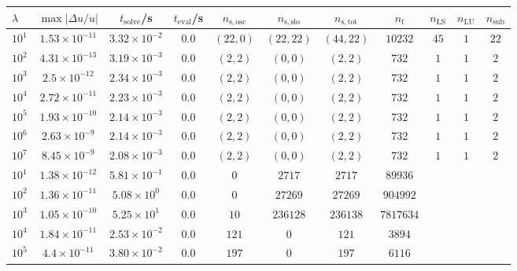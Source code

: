 \begin{tabular}{l c c c c c c c c c c}
\hline \hline 
$\lambda$  &  $\max|\Delta u/u|$  &  $t_{\mathrm{solve}}$/\si{\s}  &
$t_{\mathrm{eval}}$/\si{\s}  &  $n_{\mathrm{s,osc}}$  &  $n_{\mathrm{s,slo}}$
&  $n_{\mathrm{s,tot}}$  &  $n_{\mathrm{f}}$  &  $n_{\mathrm{LS}}$  &
$n_{\mathrm{LU}}$  &  $n_{\mathrm{sub}}$ \\ \hline
$10^1$  &  $1.53 \times 10^{-11}$  &  $3.32\times 10^{-2}$  &  $0.0$  &  $(22, 0)$  &  $(22, 22)$  &  $(44, 22)$  &  $10232$  &  $45$  &  $1$  &  $22$\\ 
$10^2$  &  $4.31 \times 10^{-13}$  &  $3.19\times 10^{-3}$  &  $0.0$  &  $(2, 2)$  &  $(0, 0)$  &  $(2, 2)$  &  $732$  &  $1$  &  $1$  &  $2$\\ 
$10^3$  &  $2.5 \times 10^{-12}$  &  $2.34\times 10^{-3}$  &  $0.0$  &  $(2, 2)$  &  $(0, 0)$  &  $(2, 2)$  &  $732$  &  $1$  &  $1$  &  $2$\\ 
$10^4$  &  $2.72 \times 10^{-11}$  &  $2.23\times 10^{-3}$  &  $0.0$  &  $(2, 2)$  &  $(0, 0)$  &  $(2, 2)$  &  $732$  &  $1$  &  $1$  &  $2$\\ 
$10^5$  &  $1.93 \times 10^{-10}$  &  $2.14\times 10^{-3}$  &  $0.0$  &  $(2, 2)$  &  $(0, 0)$  &  $(2, 2)$  &  $732$  &  $1$  &  $1$  &  $2$\\ 
$10^6$  &  $2.63 \times 10^{-9}$  &  $2.14\times 10^{-3}$   &  $0.0$  &  $(2, 2)$  &  $(0, 0)$  &  $(2, 2)$  &  $732$  &  $1$  &  $1$  &  $2$\\ 
$10^7$  &  $8.45 \times 10^{-9}$  &  $2.08\times 10^{-3}$  &  $0.0$  &  $(2, 2)$  &  $(0, 0)$  &  $(2, 2)$  &  $732$  &  $1$  &  $1$  &  $2$\\ 
\hline \hline
$10^1$  &  $1.38 \times 10^{-12}$  &  $5.81 \times 10^{-1}$  &  $0.0$  &  $0$  &  $2717$  &  $2717$  &  $89936$ & & &  \\ 
$10^2$  &  $1.36 \times 10^{-11}$  &  $5.08 \times 10^{0}$  &  $0.0$  &  $0$  &  $27269$  &  $27269$  &  $904992$  & & & \\ 
$10^3$  &  $1.05 \times 10^{-10}$  &  $5.25 \times 10^{1}$  &  $0.0$  &  $10$  &  $236128$  &  $236138$  &  $7817634$  & & & \\ 
$10^4$  &  $1.84 \times 10^{-11}$  &  $2.53 \times 10^{-2}$  &  $0.0$  &  $121$  &  $0$  &  $121$  &  $3894$  & & & \\ 
$10^5$  &  $4.4 \times 10^{-11}$  &  $3.80 \times 10^{-2}$  &  $0.0$  &  $197$  &  $0$  &  $197$  &  $6116$  & & & \\ 

\end{tabular}
